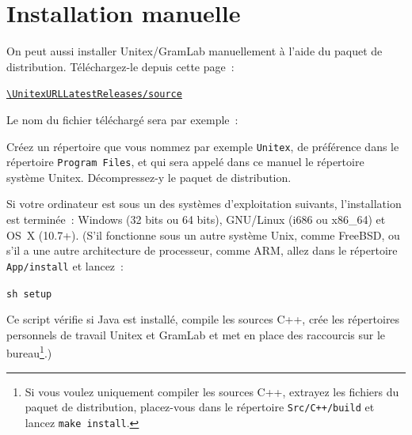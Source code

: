 \section{Installation manuelle}
\begin{samepage}

On peut aussi installer Unitex/GramLab manuellement à l'aide du paquet de distribution. Téléchargez-le depuis cette page~:
\nopagebreak
\begin{center}
{\tt\url{\UnitexURLLatestReleases/source}}
\end{center}

\noindent Le nom du fichier téléchargé sera par exemple~:
\begin{flushleft}
{\tt \UnitexPackageSource{}}
\end{flushleft}

\end{samepage}

\noindent  Créez un répertoire que vous nommez par exemple {\tt Unitex\UnitexVersion{}},
de préférence dans le répertoire  \verb+Program Files+, et qui sera appelé dans ce manuel
le répertoire système Unitex. Décompressez-y le paquet de distribution.

\bigskip
\noindent Si votre ordinateur est sous un des systèmes d'exploitation suivants, l'installation est terminée~:
Windows (32 bits ou 64 bits), GNU/Linux (i686 ou x86\_64) et OS~X (10.7+). (S'il fonctionne sous un autre système Unix, comme
FreeBSD, ou s'il a une autre architecture de processeur, comme ARM, allez dans le répertoire \verb+App/install+ et lancez~:

\begin{flushleft}
\verb+sh setup+
\end{flushleft}

\noindent Ce script vérifie si Java est installé, compile les sources C++, crée les répertoires personnels de travail
Unitex et GramLab et met en place des raccourcis sur le bureau\footnote{ Si vous voulez uniquement compiler les sources C++,
extrayez les fichiers du paquet de distribution, placez-vous dans le répertoire {\tt Src/C++/build} et lancez {\tt make install}.}.)

